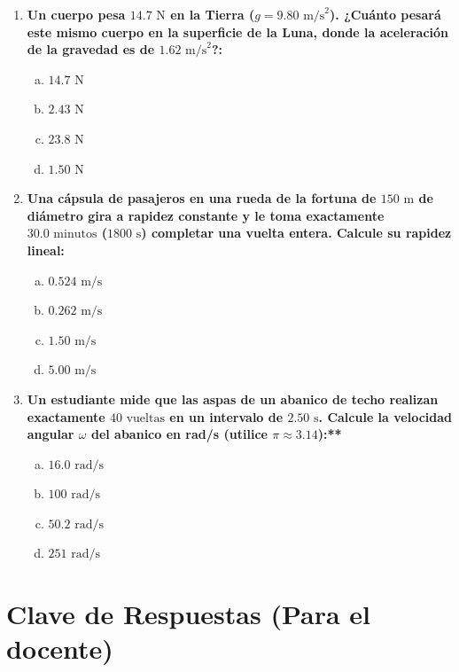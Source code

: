 \documentclass[11pt,a4paper]{article}
\begin{document}
\begin{enumerate}
    \item \textbf{Un cuerpo pesa $14.7 \text{ N}$ en la Tierra ($g = 9.80 \text{ m/s}^2$). ¿Cuánto pesará este mismo cuerpo en la superficie de la Luna, donde la aceleración de la gravedad es de $1.62 \text{ m/s}^2$?:}
    \begin{enumerate}[a)]
        \item $14.7 \text{ N}$
        \item $2.43 \text{ N}$
        \item $23.8 \text{ N}$
        \item $1.50 \text{ N}$
    \end{enumerate}

    \item \textbf{Una cápsula de pasajeros en una rueda de la fortuna de $150 \text{ m}$ de diámetro gira a rapidez constante y le toma exactamente $30.0 \text{ minutos}$ ($1800 \text{ s}$) completar una vuelta entera. Calcule su rapidez lineal:}
    \begin{enumerate}[a)]
        \item $0.524 \text{ m/s}$
        \item $0.262 \text{ m/s}$
        \item $1.50 \text{ m/s}$
        \item $5.00 \text{ m/s}$
    \end{enumerate}

    \item \textbf{Un estudiante mide que las aspas de un abanico de techo realizan exactamente $40 \text{ vueltas}$ en un intervalo de $2.50 \text{ s}$. Calcule la velocidad angular $\omega$ del abanico en rad/s (utilice $\pi \approx 3.14$):**}
    \begin{enumerate}[a)]
        \item $16.0 \text{ rad/s}$
        \item $100 \text{ rad/s}$
        \item $50.2 \text{ rad/s}$
        \item $251 \text{ rad/s}$
    \end{enumerate}
\end{enumerate}

\hr
\section*{Clave de Respuestas (Para el docente)}
\end{document}
